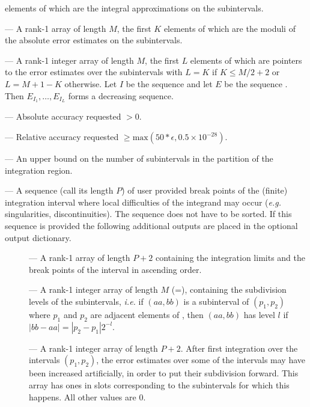 \begin{description}
\begin{description}
elements of which are the integral approximations on the subintervals.
\item[\code{'elist'}] --- A rank-1 array of length $M$, the first $K$
elements of which are the moduli of the absolute error estimates on
the subintervals.
\item[\code{'iord'}] --- A rank-1 integer array of length $M$, the first $L$
elements of which are pointers to the error estimates over the
subintervals with $L = K$ if $K \leq M/2 + 2$ or $L = M+1-K$
otherwise.  Let $I$ be the sequence  and let $E$ be
the sequence .  Then $E_{I_1},\ldots,E_{I_L}$
forms a decreasing sequence.
\end{description}
\item[\code{epsabs}] --- Absolute accuracy requested $>0$.  
\item[\code{epsrel}] --- Relative accuracy requested $\geq
\textrm{max}(50*\epsilon, 0.5 \times 10^{-28})$.
\item[\code{limit}] --- An upper bound on the number of
subintervals in the partition of the integration region.
\item[\code{points}] --- A sequence (call its length $P$) of user
provided break points of the (finite) integration interval where local
difficulties of the integrand may occur ({\em e.g.} singularities,
discontinuities).  The sequence does not have to be sorted. If this
sequence is provided the following additional outputs are placed in
the optional output dictionary.  
\begin{description}
\item[] --- A rank-1 array of length $P+2$ containing the
integration limits and the break points of the interval in ascending order. 
\item[] --- A rank-1 integer array of length $M$
(=), containing the subdivision levels of the subintervals,
{\em i.e.} if $(aa,bb)$ is a subinterval of $(p_1,p_2)$ where $p_1$ and
$p_2$ are adjacent elements of , then $(aa,bb)$ has
level $l$ if $|bb-aa| = |p_2-p_1| 2^{-l}.$ 
\item[] --- A rank-1 integer array of length $P+2$.
After first integration over the intervals $(p_1,p_2)$, the error
estimates over some of the intervals may have been increased
artificially, in order to put their subdivision forward.  This array
has ones in slots corresponding to the subintervals for which this
happens.  All other values are 0.
\end{description}

\end{description}
